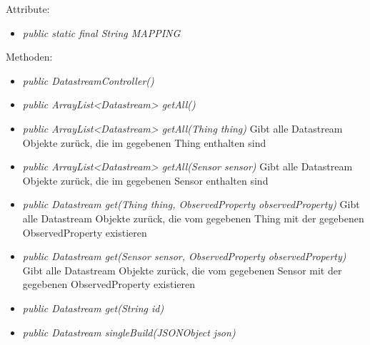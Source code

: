 Attribute:
\begin{itemize}
    \item \emph{public static final String MAPPING} \mappingDescription
\end{itemize}
Methoden:
\begin{itemize}
    \item \emph{public DatastreamController()}
    \item \emph{public ArrayList<Datastream> getAll()}
    \extendsSensorthingController
    \item \emph{public ArrayList<Datastream> getAll(Thing thing)}
    Gibt alle Datastream Objekte zurück, die im gegebenen Thing enthalten sind
    \item \emph{public ArrayList<Datastream> getAll(Sensor sensor)}
    Gibt alle Datastream Objekte zurück, die im gegebenen Sensor enthalten sind
    \item \emph{public Datastream get(Thing thing, ObservedProperty observedProperty)}
    Gibt alle Datastream Objekte zurück, die vom gegebenen Thing mit der gegebenen ObservedProperty existieren
    \item \emph{public Datastream get(Sensor sensor, ObservedProperty observedProperty)}
    Gibt alle Datastream Objekte zurück, die vom gegebenen Sensor mit der gegebenen ObservedProperty existieren
    \item \emph{public Datastream get(String id)}
    \extendsSensorthingController
    \item \emph{public Datastream singleBuild(JSONObject json)}
    \extendsSensorthingController
\end{itemize}

